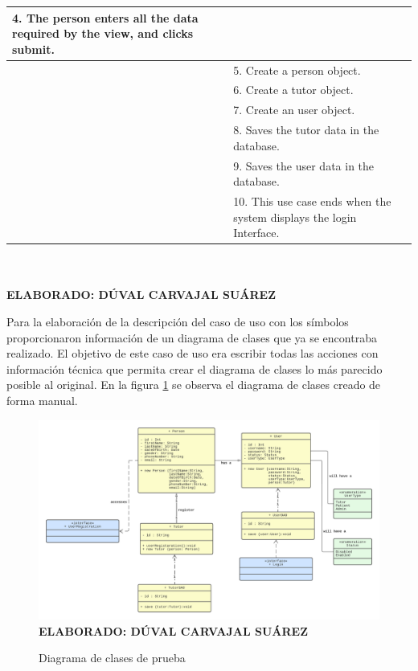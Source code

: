\begin{table}[h!]
\begin{tabular}{| p{7cm} | p{7cm} |}
		4. The person enters all the data required by the view, and clicks submit. & \\ \hline
		& 5. Create a person object. \\ \hline
		& 6. Create a tutor object. \\ \hline
		& 7. Create an user object. \\ \hline
		& 8. Saves the tutor data in the database. \\ \hline
		& 9. Saves the user data in the database. \\ \hline
		& 10. This use case ends when the system displays the login Interface.  \\ \hline
	\end{tabular} \\
	\textbf{ \\ ELABORADO: DÚVAL CARVAJAL SUÁREZ}
\end{table}

Para la elaboración de la descripción del caso de uso con los símbolos proporcionaron información de un diagrama de clases que ya se encontraba realizado. El objetivo de este caso de uso era escribir todas las acciones con información técnica que permita crear el diagrama de clases lo más parecido posible al original. En la figura \ref{fig:cdtest} se observa el diagrama de clases creado de forma manual.

\begin{figure}[h!]
	\caption{Diagrama de clases de prueba}
	\includegraphics[width=15.5cm]{img/cdtest.png}
	\label{fig:cdtest}
	\textbf{\\ ELABORADO: DÚVAL CARVAJAL SUÁREZ}
\end{figure}

